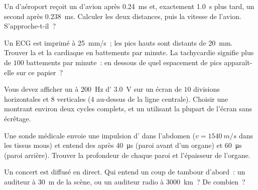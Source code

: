\begin{exercise}[$\star\star$]\label{exo:g10:signals-and-waves:7}
Un  d'aéroport reçoit un  d'avion
après \qty{0.24}{ms} et, exactement \qty{1.0}{s} plus tard, un second
 après \qty{0.238}{ms}. Calculer les deux distances,
puis la vitesse de l'avion. S'approche-t-il~?
\end{exercise}

\begin{exercise}[$\star\star$]\label{exo:g10:signals-and-waves:8}
Un ECG est imprimé à \qty{25}{mm/s}~; les pics hauts sont distants de
\qty{20}{mm}. Trouver la  et la 
cardiaque en battements par minute. La tachycardie signifie plus de
$100$ battements par minute~: en dessous de quel espacement de pics
apparaît-elle sur ce papier~?
\end{exercise}

\begin{exercise}[$\star\star$]\label{exo:g10:signals-and-waves:9}
Vous devez afficher un  à \qty{200}{Hz}
d' \qty{3.0}{V} sur un écran de $10$
divisions horizontales et $8$ verticales ($4$ au-dessus de la ligne
centrale). Choisir une  montrant environ
deux cycles complets, et un  utilisant la plupart
de l'écran sans écrêtage.
\end{exercise}

\begin{exercise}[$\star\star$]\label{exo:g10:signals-and-waves:10}
Une sonde médicale envoie une impulsion d' dans
l'abdomen ($v = \qty{1540}{m/s}$ dans les tissus mous) et entend des
 après \qty{40}{\micro s} (paroi avant d'un organe) et
\qty{60}{\micro s} (paroi arrière). Trouver la profondeur de chaque
paroi et l'épaisseur de l'organe.
\end{exercise}

\begin{exercise}[$\star\star$]\label{exo:g10:signals-and-waves:11}
Un concert est diffusé en direct. Qui entend un coup de tambour
d'abord~: un auditeur à \qty{30}{m} de la scène, ou un auditeur radio
à \qty{3000}{km}~? De combien~?
\end{exercise}

